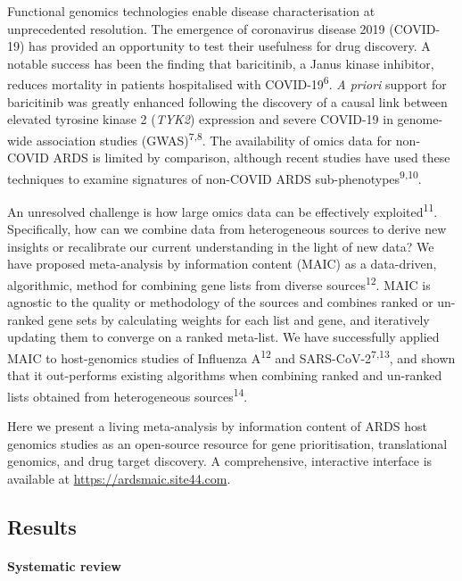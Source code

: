 \documentclass[
  11,
  a4paper,
]{article}
\let\oldparagraph\paragraph
\renewcommand{\paragraph}[1]{\oldparagraph{#1}\mbox{}}
\begin{document}
Functional genomics technologies enable disease characterisation at
unprecedented resolution. The emergence of coronavirus disease 2019
(COVID-19) has provided an opportunity to test their usefulness for drug
discovery. A notable success has been the finding that baricitinib, a
Janus kinase inhibitor, reduces mortality in patients hospitalised with
COVID-19\textsuperscript{6}. \emph{A priori} support for baricitinib was
greatly enhanced following the discovery of a causal link between
elevated tyrosine kinase 2 (\emph{TYK2}) expression and severe COVID-19
in genome-wide association studies (GWAS)\textsuperscript{7,8}. The
availability of omics data for non-COVID ARDS is limited by comparison,
although recent studies have used these techniques to examine signatures
of non-COVID ARDS sub-phenotypes\textsuperscript{9,10}.

An unresolved challenge is how large omics data can be effectively
exploited\textsuperscript{11}. Specifically, how can we combine data
from heterogeneous sources to derive new insights or recalibrate our
current understanding in the light of new data? We have proposed
meta-analysis by information content (MAIC) as a data-driven,
algorithmic, method for combining gene lists from diverse
sources\textsuperscript{12}. MAIC is agnostic to the quality or
methodology of the sources and combines ranked or un-ranked gene sets by
calculating weights for each list and gene, and iteratively updating
them to converge on a ranked meta-list. We have successfully applied
MAIC to host-genomics studies of Influenza A\textsuperscript{12} and
SARS-CoV-2\textsuperscript{7,13}, and shown that it out-performs
existing algorithms when combining ranked and un-ranked lists obtained
from heterogeneous sources\textsuperscript{14}.

Here we present a living meta-analysis by information content of ARDS
host genomics studies as an open-source resource for gene
prioritisation, translational genomics, and drug target discovery. A
comprehensive, interactive interface is available at
\url{https://ardsmaic.site44.com}.

\newpage

\hypertarget{results}{%
\subsection{Results}\label{results}}

\hypertarget{systematic-review}{%
\paragraph{Systematic review}\label{systematic-review}}
\end{document}
